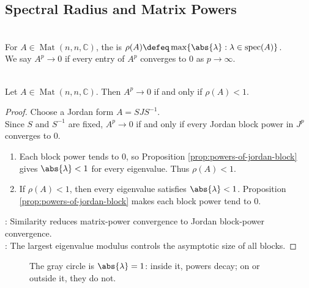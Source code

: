 \subsection{Spectral Radius and Matrix Powers}

\begin{definition} \label{def:spectral-radius-and-convergent-matrix} \\
For $A\in\operatorname{Mat}(n,n,\mathbb{C})$, the  is $\rho(A)\defeq\max\{\abs{\lambda}:\lambda\in\operatorname{spec}(A)\}$.\\
We say $A^p\to0$ if every entry of $A^p$ converges to $0$ as $p\to\infty$.
\end{definition}

\begin{theorem} \label{thm:matrix-powers-converge-to-zero-spectral-radius} \\
Let $A\in\operatorname{Mat}(n,n,\mathbb{C})$. Then $A^p\to0$ if and only if $\rho(A)<1$.
\begin{proof}
Choose a Jordan form $A=SJS^{-1}$.\\
Since $S$ and $S^{-1}$ are fixed, $A^p\to0$ if and only if every Jordan block power in $J^p$ converges to $0$.
\begin{enumerate}[label=\roman*.]
\setlength{\itemsep}{0pt}
\item[$(\Rightarrow)$] Each block power tends to $0$, so Proposition \ref{prop:powers-of-jordan-block} gives $\abs{\lambda}<1$ for every eigenvalue. Thus $\rho(A)<1$.
\item[$(\Leftarrow)$] If $\rho(A)<1$, then every eigenvalue satisfies $\abs{\lambda}<1$. Proposition \ref{prop:powers-of-jordan-block} makes each block power tend to $0$.
\end{enumerate}
: Similarity reduces matrix-power convergence to Jordan block-power convergence.\\
: The largest eigenvalue modulus controls the asymptotic size of all blocks.
\end{proof}
\end{theorem}

\begin{figure}[H]
  \centering
  
  \caption{The gray circle is $\abs{\lambda}=1$: inside it, powers decay; on or outside it, they do not.}
  \label{fig:jordan-spectral-radius-convergence}
\end{figure}

